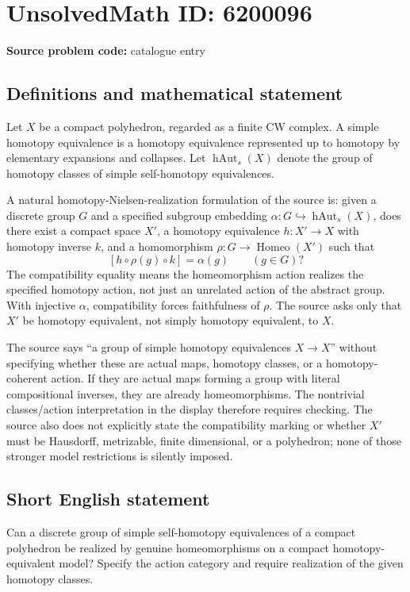 \documentclass[11pt]{article}
\begin{document}
\section*{UnsolvedMath ID: 6200096}
\textbf{Source problem code:} catalogue entry
\subsection{Definitions and mathematical statement}
Let $X$ be a compact polyhedron, regarded as a finite CW complex. A simple homotopy equivalence is a homotopy equivalence represented up to homotopy by elementary expansions and collapses. Let $\operatorname{hAut}_s(X)$ denote the group of homotopy classes of simple self-homotopy equivalences.

A natural homotopy-Nielsen-realization formulation of the source is: given a discrete group $G$ and a specified subgroup embedding $\alpha:G\hookrightarrow\operatorname{hAut}_s(X)$, does there exist a compact space $X'$, a homotopy equivalence $h:X'\to X$ with homotopy inverse $k$, and a homomorphism $\rho:G\to\operatorname{Homeo}(X')$ such that
\[
[h\circ\rho(g)\circ k]=\alpha(g)\qquad(g\in G)?
\]
The compatibility equality means the homeomorphism action realizes the specified homotopy action, not just an unrelated action of the abstract group. With injective $\alpha$, compatibility forces faithfulness of $\rho$. The source asks only that $X'$ be homotopy equivalent, not simply homotopy equivalent, to $X$.

The source says ``a group of simple homotopy equivalences $X\to X$'' without specifying whether these are actual maps, homotopy classes, or a homotopy-coherent action. If they are actual maps forming a group with literal compositional inverses, they are already homeomorphisms. The nontrivial classes/action interpretation in the display therefore requires checking. The source also does not explicitly state the compatibility marking or whether $X'$ must be Hausdorff, metrizable, finite dimensional, or a polyhedron; none of those stronger model restrictions is silently imposed.
\subsection{Short English statement}
Can a discrete group of simple self-homotopy equivalences of a compact polyhedron be realized by genuine homeomorphisms on a compact homotopy-equivalent model? Specify the action category and require realization of the given homotopy classes.
\end{document}

